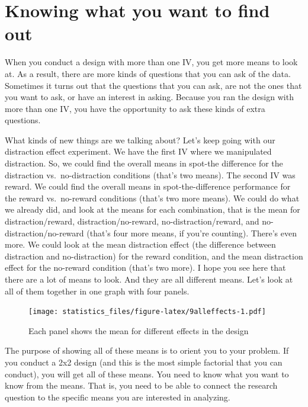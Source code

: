 \documentclass[]{book}
\begin{document}
\hypertarget{knowing-what-you-want-to-find-out}{%
\section{Knowing what you want to find out}\label{knowing-what-you-want-to-find-out}}

When you conduct a design with more than one IV, you get more means to look at. As a result, there are more kinds of questions that you can ask of the data. Sometimes it turns out that the questions that you can ask, are not the ones that you want to ask, or have an interest in asking. Because you ran the design with more than one IV, you have the opportunity to ask these kinds of extra questions.

What kinds of new things are we talking about? Let's keep going with our distraction effect experiment. We have the first IV where we manipulated distraction. So, we could find the overall means in spot-the difference for the distraction vs.~no-distraction conditions (that's two means). The second IV was reward. We could find the overall means in spot-the-difference performance for the reward vs.~no-reward conditions (that's two more means). We could do what we already did, and look at the means for each combination, that is the mean for distraction/reward, distraction/no-reward, no-distraction/reward, and no-distraction/no-reward (that's four more means, if you're counting). There's even more. We could look at the mean distraction effect (the difference between distraction and no-distraction) for the reward condition, and the mean distraction effect for the no-reward condition (that's two more). I hope you see here that there are a lot of means to look. And they are all different means. Let's look at all of them together in one graph with four panels.

\begin{figure}
\centering
\texttt{[image: statistics\_files/figure-latex/9alleffects-1.pdf]}
\caption{\label{fig:9alleffects}Each panel shows the mean for different effects in the design}
\end{figure}

The purpose of showing all of these means is to orient you to your problem. If you conduct a 2x2 design (and this is the most simple factorial that you can conduct), you will get all of these means. You need to know what you want to know from the means. That is, you need to be able to connect the research question to the specific means you are interested in analyzing.
\end{document}
